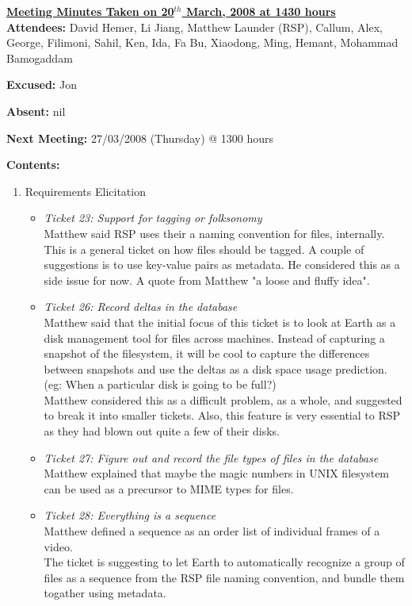 \documentclass{letter}
\begin{document}
{\large \textbf{\underline{Meeting Minutes Taken on 20$^{th}$ March, 2008 at 1430 hours}}}\\

\textbf{Attendees:} David Hemer, Li Jiang, Matthew Launder (RSP), Callum, Alex, George,  Filimoni, Sahil, Ken, Ida, Fa Bu, Xiaodong, Ming, Hemant, Mohammad Bamogaddam

\textbf{Excused:} Jon

\textbf{Absent:} nil

\textbf{Next Meeting:} 27/03/2008 (Thursday) @ 1300 hours

\textbf{Contents:}

\begin{enumerate}
\item Requirements Elicitation
	\begin{itemize}
	\item \textit{Ticket 23: Support for tagging or folksonomy} \\
	Matthew said RSP uses their a naming convention for files, internally. This is a general ticket on how files should be tagged. A couple of suggestions is to use key-value pairs as metadata. He considered this as a side issue for now. A quote from Matthew "a loose and fluffy idea". 
	\item \textit{Ticket 26: Record deltas in the database} \\
	Matthew said that the initial focus of this ticket is to look at Earth as a disk management tool for files across machines. Instead of capturing a snapshot of the filesystem, it will be cool to capture the differences between snapshots and use the deltas as a disk space usage prediction. (eg: When a particular disk is going to be full?) \\
	Matthew considered this as a difficult problem, as a whole, and suggested to break it into smaller tickets. Also, this feature is very essential to RSP as they had blown out quite a few of their disks. 
	\item \textit{Ticket 27: Figure out and record the file types of files in the database} \\
	Matthew explained that maybe the magic numbers in UNIX filesystem can be used as a precursor to MIME types for files. 
	\item \textit{Ticket 28: Everything is a sequence} \\
	Matthew defined a sequence as an order list of individual frames of a video. \\
	The ticket is suggesting to let Earth to automatically recognize a group of files as a sequence from the RSP file naming convention, and bundle them togather using metadata. \\

\end{itemize}
\end{enumerate}
\end{document}
